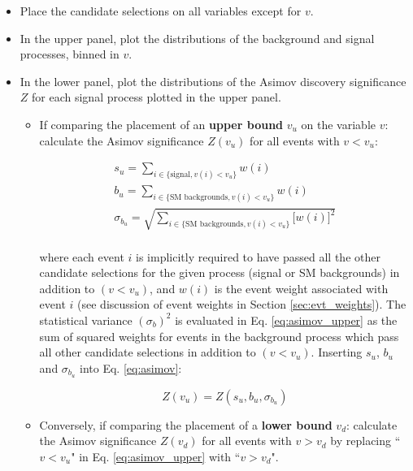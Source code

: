 \begin{itemize} 
\item Place the candidate selections on all variables except for \(v\).
\item In the upper panel, plot the distributions of the background and signal processes, binned in \(v\).
\item In the lower panel, plot the distributions of the Asimov discovery significance \(Z\) for each signal process plotted in the upper panel.
\begin{itemize}
\item If comparing the placement of an \textbf{upper bound} \(v_u\) on the variable \(v\): calculate the Asimov significance \(Z(v_u)\) for all events with \(v<v_u\): 

\begin{equation}
\label{eq:asimov_upper}
\begin{gathered}
s_u = \sum_{i \in \{\text{signal}, v(i) < v_u\}} w(i) \\
b_u =  \sum_{i \in \{\text{SM backgrounds}, v(i) < v_u\}} w(i) \\
\sigma_{b_u} = \sqrt{ \sum_{i \in \{\text{SM backgrounds}, v(i) < v_u\}} \big[w(i)\big]^2 } \\
\end{gathered}
\end{equation}

\noindent where each event \(i\) is implicitly required to have passed all the other candidate selections for the given process (signal or SM backgrounds) in addition to \((v < v_u)\), and \(w(i)\) is the event weight associated with event \(i\) (see discussion of event weights in Section \ref{sec:evt_weights}). The statistical variance \((\sigma_b)^2\) is evaluated in Eq. \ref{eq:asimov_upper} as the sum of squared weights for events in the background process which pass all other candidate selections in addition to \((v < v_u)\). Inserting \(s_u\), \(b_u\) and \(\sigma_{b_u}\) into Eq. \ref{eq:asimov}:

\begin{equation}
\label{eq:asimov_upper}
Z(v_u) = Z(s_u, b_u, \sigma_{b_u} )
\end{equation}

\item Conversely, if comparing the placement of a \textbf{lower bound} \(v_d\): calculate the Asimov significance \(Z(v_d)\) for all events with \(v>v_d\) by replacing ``\(v<v_u\)" in Eq. \ref{eq:asimov_upper} with ``\(v>v_d\)".
\end{itemize}
\end{itemize}

